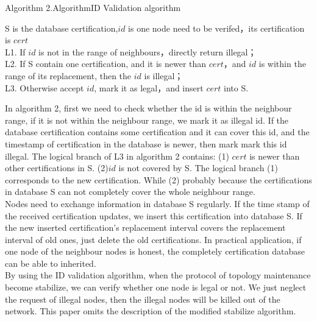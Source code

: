 \documentclass[10pt]{article}
\begin{document}
\begin{center}
Algorithm 2.AlgorithmID Validation algorithm 
\end{center}
\begin{minipage}[l]{360pt}
    S is the database certification,$id$ is one node need to be verifed，its certification is $cert$ \\  
    L1. If $id$ is not in the range of neighbours，directly return illegal；\\
    L2. If S contain one certification, and it is newer than $cert$，and $id$ is within the range of its replacement, then the $id$ is illegal；\\
    L3. Otherwise accept $id$, mark it as legal，and insert $cert$ into S.
\end{minipage}
In algorithm 2, first we need to check whether the id is within the neighbour range, if it is not within the neighbour range, we mark it as illegal id. If the database certification contains some certification and it can cover this id, and the timestamp of certification in the database is newer, then mark mark this id illegal.  The logical branch of L3 in algorithm 2 contains: (1) $cert$ is newer than other certifications in S. (2)$id$ is not covered by S. The logical branch (1) corresponds to the new certification. While (2) probably because the certifications in database S can not completely cover the whole neighbour range. \\
Nodes need to exchange information in database S regularly. If the time stamp of the received certification updates, we insert this certification into database S. If the new inserted certification's replacement interval covers the replacement interval of old ones, just delete the old certifications. In practical application, if one node of the neighbour nodes is honest, the completely certification database can be able to inherited.\\
By using the ID validation algorithm, when the protocol of topology maintenance become stabilize, we can verify whether one node is legal or not. We just neglect the request of illegal nodes, then the illegal nodes will be killed out of the network. This paper omits the description of the modified stabilize algorithm. 
\end{document}
